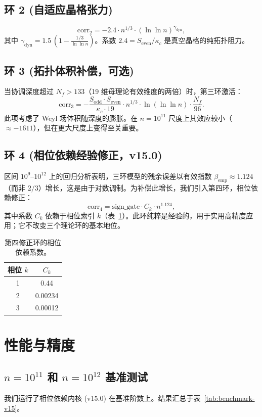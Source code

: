 \documentclass[11pt,a4paper]{article}
\newcommand{\kappac}{\kappa_c}
\newcommand{\Sodd}{S_{\mathrm{odd}}}
\newcommand{\Seven}{S_{\mathrm{even}}}
\begin{document}
	\subsection{环 2 (自适应晶格张力)}
	\[
	\mathrm{corr}_2 = -2.4 \cdot n^{1/3} \cdot (\ln\ln n)^{\gamma_{\mathrm{dyn}}},
	\]
	其中 \(\gamma_{\mathrm{dyn}} = 1.5\,(1 - \frac{1/3}{\ln\ln n})\)。系数 \(2.4 = \Seven/\kappac\) 是真空晶格的纯拓扑阻力。
	
	\subsection{环 3 (拓扑体积补偿，可选)}
	当协调深度超过 \(N_f > 133\)（19 维母理论有效维度的两倍）时，第三环激活：
	\[
	\mathrm{corr}_3 = -\frac{\Sodd\cdot\Seven}{\kappac\cdot 19} \cdot n^{1/3} \cdot \ln(\ln\ln n) \cdot \frac{N_f}{96}.
	\]
	此项考虑了 Weyl 场体积随深度的膨胀。在 \(n=10^{11}\) 尺度上其效应较小（\(\approx -1611\)），但在更大尺度上变得至关重要。
	
	\subsection{环 4 (相位依赖经验修正，v15.0)}
	区间 \(10^9\)--\(10^{12}\) 上的回归分析表明，三环模型的残余误差以有效指数 \(\beta_{\mathrm{emp}} \approx 1.124\)（而非 \(2/3\)）增长，这是由于对数调制。为补偿此增长，我们引入第四环，相位依赖修正：
	\[
	\mathrm{corr}_4 = \mathrm{sign\_gate} \cdot C_k \cdot n^{1.124},
	\]
	其中系数 \(C_k\) 依赖于相位索引 \(k\)（表~\ref{tab:phase-coeffs}）。此环纯粹是经验的，用于实用高精度应用；它不改变三个理论环的基本地位。
	
	\begin{table}[htbp]
		\centering
		\caption{第四修正环的相位依赖系数。}
		\label{tab:phase-coeffs}
		\begin{tabular}{c c}
			\toprule
			相位 \(k\) & \(C_k\) \\
			\midrule
			1 & 0.44 \\
			2 & 0.00234 \\
			3 & 0.00012 \\
			\bottomrule
		\end{tabular}
	\end{table}
	
	\section{性能与精度}
	\label{sec:performance}
	\subsection{\(n=10^{11}\) 和 \(n=10^{12}\) 基准测试}
	我们运行了相位依赖内核 (v15.0) 在基准阶数上。结果汇总于表~\ref{tab:benchmark-v15}。
	
\end{document}
